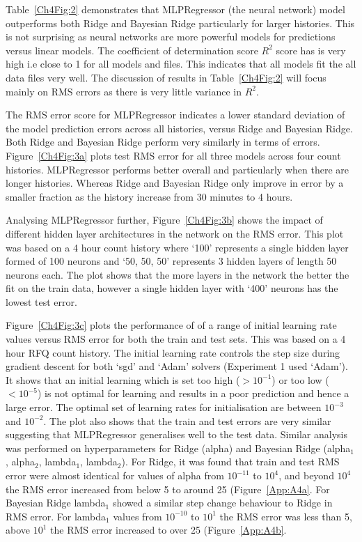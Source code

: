 Table~\ref{Ch4Fig:2} demonstrates that MLPRegressor (the neural network) model outperforms both Ridge and Bayesian Ridge particularly for larger histories. This is not surprising as neural networks are more powerful models for predictions versus linear models. The coefficient of determination score $R^2$ score has is very high i.e close to 1 for all models and files. This indicates that all models fit the all data files very well. The discussion of results in Table~\ref{Ch4Fig:2} will focus mainly on RMS errors as there is very little variance in $R^2$. 

The RMS error score for MLPRegressor indicates a lower standard deviation of the model prediction errors across all histories, versus Ridge and Bayesian Ridge. Both Ridge and Bayesian Ridge perform very similarly in terms of errors. Figure~\ref{Ch4Fig:3a} plots test RMS error for all three models across four count histories. MLPRegressor performs better overall and particularly when there are longer histories. Whereas Ridge and Bayesian Ridge only improve in error by a smaller fraction as the history increase from 30 minutes to 4 hours.

Analysing MLPRegressor further, Figure~\ref{Ch4Fig:3b} shows the impact of different hidden layer architectures in the network on the RMS error. This plot was based on a 4 hour count history where `100' represents a single hidden layer formed of 100 neurons and `50, 50, 50' represents 3 hidden layers of length 50 neurons each. The plot shows that the more layers in the network the better the fit on the train data, however a single hidden layer with `400' neurons has the lowest test error.

Figure~\ref{Ch4Fig:3c} plots the performance of of a range of initial learning rate values versus RMS error for both the train and test sets. This was based on a 4 hour RFQ count history. The initial learning rate controls the step size during gradient descent for both `sgd' and `Adam' solvers (Experiment 1 used `Adam'). It shows that an initial learning which is set too high ($>10^{-1}$) or too low ($<10^{-5}$) is not optimal for learning and results in a poor prediction and hence a large error. The optimal set of learning rates for initialisation are between $10^{-3}$ and $10^{-2}$. The plot also shows that the train and test errors are very similar suggesting that MLPRegressor generalises well to the test data. Similar analysis was performed on hyperparameters for Ridge (alpha) and Bayesian Ridge (alpha$_1$, alpha$_2$, lambda$_1$, lambda$_2$). For Ridge, it was found that train and test RMS error were almost identical for values of alpha from  $10^{-11}$ to $10^{4}$, and beyond $10^{4}$ the RMS error increased from below 5 to around 25 (Figure~\ref{App:A4a}. For Bayesian Ridge lambda$_1$ showed a similar step change behaviour to Ridge in RMS error. For lambda$_1$ values from  $10^{-10}$ to  $10^{1}$ the RMS error was less than 5, above $10^{1}$ the RMS error increased to over 25 (Figure~\ref{App:A4b}.

